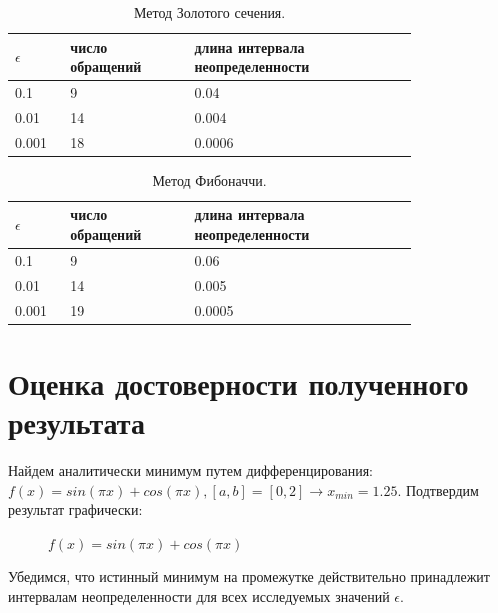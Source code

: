 \documentclass[main.tex]{subfiles}
\begin{document}
	\begin{table}[h]
		\begin{tabular} { | p{0.1\linewidth} | p{0.25\linewidth} | p{0.45\linewidth} |}
			\hline
			$\epsilon$ & число обращений & длина интервала неопределенности  \\ \hline
			0.1 & 9 & 0.04  \\ \hline
			0.01 & 14 & 0.004  \\ \hline
			0.001 & 18 & 0.0006   \\ \hline
		\end{tabular}
		\caption{Метод Золотого сечения.}
	\end{table}
	
	\begin{table}[h]
		\begin{tabular} { | p{0.1\linewidth} | p{0.25\linewidth} | p{0.45\linewidth} |}
			\hline
			$\epsilon$ & число обращений & длина интервала неопределенности  \\ \hline
			0.1 & 9 & 0.06  \\ \hline
			0.01 & 14 & 0.005 \\ \hline
			0.001 & 19 &  0.0005  \\ \hline
		\end{tabular}
		\caption{Метод Фибоначчи.}
	\end{table}
	
	
	\section{Оценка достоверности полученного результата}
	Найдем аналитически минимум путем дифференцирования:
	$f(x) = sin(\pi x) + cos(\pi x), [a, b] = [0, 2] \rightarrow x_{min} = 1.25.$
	Подтвердим результат графически:
	\begin{figure}[H]
		\caption{$f(x) = sin(\pi x) + cos(\pi x)$}
		\label{function2}
	\end{figure}
	Убедимся, что истинный минимум на промежутке действительно принадлежит интервалам неопределенности для всех исследуемых значений $\epsilon$.\\
	
\end{document}
